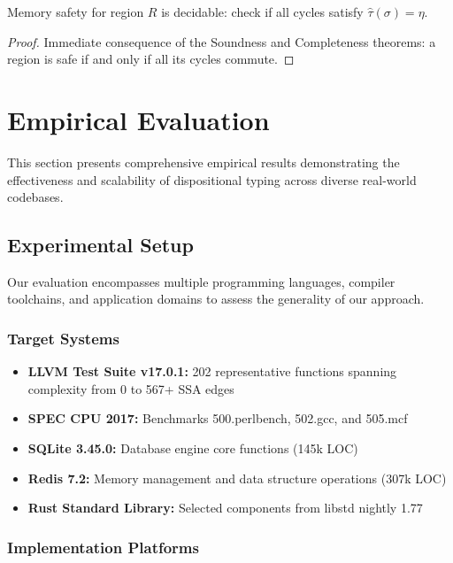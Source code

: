 \documentclass[journal]{IEEEtran}
\begin{document}
\begin{corollary}
\label{cor:decidability}
Memory safety for region $R$ is decidable: check if all cycles satisfy $\hat{\tau}(\sigma) = \eta$.
\end{corollary}

\begin{proof}
Immediate consequence of the Soundness and Completeness theorems: a region is safe if and only if all its cycles commute.
\end{proof}

\section{Empirical Evaluation}
\label{sec:evaluation}

This section presents comprehensive empirical results demonstrating the effectiveness and scalability of dispositional typing across diverse real-world codebases.

\subsection{Experimental Setup}

Our evaluation encompasses multiple programming languages, compiler toolchains, and application domains to assess the generality of our approach.

\subsubsection{Target Systems}

\begin{itemize}
\item \textbf{LLVM Test Suite v17.0.1:} 202 representative functions spanning complexity from 0 to 567+ SSA edges
\item \textbf{SPEC CPU 2017:} Benchmarks 500.perlbench, 502.gcc, and 505.mcf  
\item \textbf{SQLite 3.45.0:} Database engine core functions (145k LOC)
\item \textbf{Redis 7.2:} Memory management and data structure operations (307k LOC)
\item \textbf{Rust Standard Library:} Selected components from libstd nightly 1.77
\end{itemize}

\subsubsection{Implementation Platforms}
\end{document}
